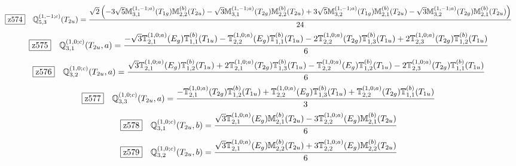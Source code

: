 \documentclass[fleqn,10pt,landscape]{jsarticle}
\begin{document}
\begin{dmath*}
\hspace*{3mm}\fbox{z574}\quad \mathbb{Q}_{5,3}^{(1,-1;c)}(T_{2u})=\frac{\sqrt{2} \left(- 3 \sqrt{5} \mathbb{M}_{3,1}^{(1,-1;a)}(T_{1g}) \mathbb{M}_{2,2}^{(b)}(T_{2u}) - \sqrt{3} \mathbb{M}_{3,1}^{(1,-1;a)}(T_{2g}) \mathbb{M}_{2,2}^{(b)}(T_{2u}) + 3 \sqrt{5} \mathbb{M}_{3,2}^{(1,-1;a)}(T_{1g}) \mathbb{M}_{2,1}^{(b)}(T_{2u}) - \sqrt{3} \mathbb{M}_{3,2}^{(1,-1;a)}(T_{2g}) \mathbb{M}_{2,1}^{(b)}(T_{2u})\right)}{24}
\end{dmath*}
\begin{dmath*}
\hspace*{3mm}\fbox{z575}\quad \mathbb{Q}_{3,1}^{(1,0;c)}(T_{2u},a)=\frac{- \sqrt{3} \mathbb{T}_{2,1}^{(1,0;a)}(E_{g}) \mathbb{T}_{1,1}^{(b)}(T_{1u}) - \mathbb{T}_{2,2}^{(1,0;a)}(E_{g}) \mathbb{T}_{1,1}^{(b)}(T_{1u}) - 2 \mathbb{T}_{2,2}^{(1,0;a)}(T_{2g}) \mathbb{T}_{1,3}^{(b)}(T_{1u}) + 2 \mathbb{T}_{2,3}^{(1,0;a)}(T_{2g}) \mathbb{T}_{1,2}^{(b)}(T_{1u})}{6}
\end{dmath*}
\begin{dmath*}
\hspace*{3mm}\fbox{z576}\quad \mathbb{Q}_{3,2}^{(1,0;c)}(T_{2u},a)=\frac{\sqrt{3} \mathbb{T}_{2,1}^{(1,0;a)}(E_{g}) \mathbb{T}_{1,2}^{(b)}(T_{1u}) + 2 \mathbb{T}_{2,1}^{(1,0;a)}(T_{2g}) \mathbb{T}_{1,3}^{(b)}(T_{1u}) - \mathbb{T}_{2,2}^{(1,0;a)}(E_{g}) \mathbb{T}_{1,2}^{(b)}(T_{1u}) - 2 \mathbb{T}_{2,3}^{(1,0;a)}(T_{2g}) \mathbb{T}_{1,1}^{(b)}(T_{1u})}{6}
\end{dmath*}
\begin{dmath*}
\hspace*{3mm}\fbox{z577}\quad \mathbb{Q}_{3,3}^{(1,0;c)}(T_{2u},a)=\frac{- \mathbb{T}_{2,1}^{(1,0;a)}(T_{2g}) \mathbb{T}_{1,2}^{(b)}(T_{1u}) + \mathbb{T}_{2,2}^{(1,0;a)}(E_{g}) \mathbb{T}_{1,3}^{(b)}(T_{1u}) + \mathbb{T}_{2,2}^{(1,0;a)}(T_{2g}) \mathbb{T}_{1,1}^{(b)}(T_{1u})}{3}
\end{dmath*}
\begin{dmath*}
\hspace*{3mm}\fbox{z578}\quad \mathbb{Q}_{3,1}^{(1,0;c)}(T_{2u},b)=\frac{\sqrt{3} \mathbb{T}_{2,1}^{(1,0;a)}(E_{g}) \mathbb{M}_{2,1}^{(b)}(T_{2u}) - 3 \mathbb{T}_{2,2}^{(1,0;a)}(E_{g}) \mathbb{M}_{2,1}^{(b)}(T_{2u})}{6}
\end{dmath*}
\begin{dmath*}
\hspace*{3mm}\fbox{z579}\quad \mathbb{Q}_{3,2}^{(1,0;c)}(T_{2u},b)=\frac{\sqrt{3} \mathbb{T}_{2,1}^{(1,0;a)}(E_{g}) \mathbb{M}_{2,2}^{(b)}(T_{2u}) + 3 \mathbb{T}_{2,2}^{(1,0;a)}(E_{g}) \mathbb{M}_{2,2}^{(b)}(T_{2u})}{6}
\end{dmath*}
\end{document}
